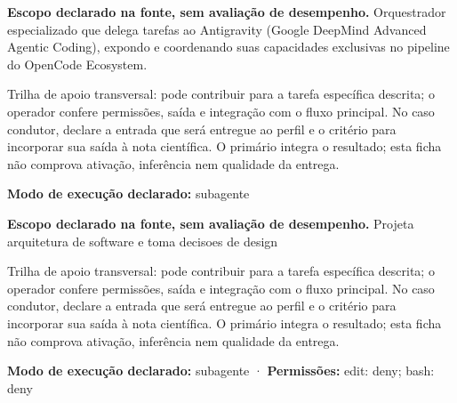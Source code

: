 
\begin{descricao}
\textbf{Escopo declarado na fonte, sem avaliação de desempenho.}
Orquestrador especializado que delega tarefas ao Antigravity (Google DeepMind Advanced Agentic Coding), expondo e coordenando suas capacidades exclusivas no pipeline do OpenCode Ecosystem.
\end{descricao}

\begin{funcao}
Trilha de apoio transversal: pode contribuir para a tarefa específica descrita; o operador confere permissões, saída e integração com o fluxo principal. No caso condutor, declare a entrada que será entregue ao perfil e o critério para incorporar sua saída à nota científica. O primário integra o resultado; esta ficha não comprova ativação, inferência nem qualidade da entrega.
\end{funcao}

\begin{arquitetura}
\textbf{Modo de execução declarado:} subagente
\end{arquitetura}


\begin{descricao}
\textbf{Escopo declarado na fonte, sem avaliação de desempenho.}
Projeta arquitetura de software e toma decisoes de design
\end{descricao}

\begin{funcao}
Trilha de apoio transversal: pode contribuir para a tarefa específica descrita; o operador confere permissões, saída e integração com o fluxo principal. No caso condutor, declare a entrada que será entregue ao perfil e o critério para incorporar sua saída à nota científica. O primário integra o resultado; esta ficha não comprova ativação, inferência nem qualidade da entrega.
\end{funcao}

\begin{arquitetura}
\textbf{Modo de execução declarado:} subagente · \textbf{Permissões:} edit: deny; bash: deny
\end{arquitetura}

